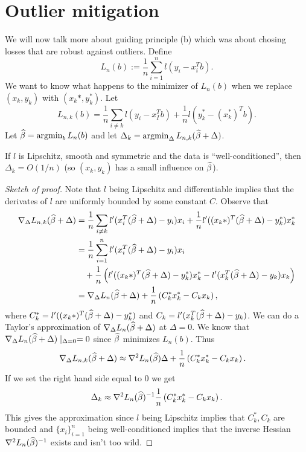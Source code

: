\section{Outlier mitigation}
We will now talk more about guiding principle (b) which was about chosing losses that are robust against outliers. Define
\[L_n(b):= \frac{1}{n}\sum_{i=1}^n l(y_i-x_i^Tb). \]
We want to know what happens to the minimizer of $L_n(b)$ when we replace $(x_k,y_k)$ with $(x_k*, y_k^*)$. Let
\[L_{n,k}(b)=\frac{1}{n}\sum_{i \neq k} l(y_i-x_I^Tb)+\frac{1}{n}l(y_k^*-(x_k^*)^Tb). \]
Let $\widehat{\beta}=\operatorname*{argmin}_b L_n(b)$ and let $\Delta_k = \operatorname*{argmin}_\Delta L_{n,k}(\widehat{\beta}+\Delta)$.
\begin{prop}
    If $l$ is Lipschitz, smooth and symmetric and the data is ``well-conditioned'', then $\Delta_k = O(1/n)$ (so $(x_k, y_k)$ has a small influence on $\widehat{\beta}$).
\end{prop}
\begin{proof}[Sketch of proof]
    Note that $l$ being Lipschitz and differentiable implies that the derivates of $l$ are uniformly bounded by some constant $C$. Observe that
    \begin{align*}
        \nabla_{\Delta} L_{n,k}(\widehat{\beta}+\Delta)&=\frac{1}{n}\sum_{i\neq k}l'(x_i^T(\widehat{\beta}+\Delta)-y_i)x_i+\frac{1}{n}l'((x_k*)^T(\widehat{\beta}+\Delta)-y_k^*)x_k^*\\
        &=\frac{1}{n}\sum_{i=1}^nl'(x_i^T(\widehat{\beta}+\Delta)-y_i)x_i\\
        &~~~+\frac{1}{n}\left(l'((x_k*)^T(\widehat{\beta}+\Delta)-y_k^*)x_k^*-l'(x_k^T(\widehat{\beta}+\Delta)-y_k)x_k\right)\\
        &=\nabla_{\Delta} L_n(\widehat{\beta}+\Delta)+\frac{1}{n}\left(C_k^*x_k^*-C_kx_k\right),
    \end{align*}
    where $C_k^*=l'((x_k*)^T(\widehat{\beta}+\Delta)-y_k^*)$ and $C_k = l'(x_k^T(\widehat{\beta}+\Delta)-y_k)$. We can do a Taylor's approximation of $\nabla_{\Delta} L_n(\widehat{\beta}+\Delta)$ at $\Delta=0$. We know that $\nabla_{\Delta} L_n(\widehat{\beta}+\Delta)\mid_{\Delta=0}=0$ since $\widehat{\beta}$ minimizes $L_n(b)$. Thus
    \begin{align*}
        \nabla_{\Delta} L_{n,k}(\widehat{\beta}+\Delta)&\approx \nabla^2 L_n(\widehat{\beta})\Delta + \frac{1}{n}\left(C_k^*x_k^*-C_kx_k\right).
    \end{align*}
    If we set the right hand side equal to 0 we get
    \[ \Delta_k\approx \nabla^2 L_n(\widehat{\beta})^{-1}\frac{1}{n}\left(C_k^*x_k^*-C_kx_k\right).\] 
    This gives the approximation since $l$ being Lipschitz implies that $C_k^*,C_k$ are bounded and $\{x_i\}_{i=1}^n$ being well-conditioned implies that the inverse Hessian $\nabla^2 L_n(\widehat{\beta})^{-1}$ exists and isn't too wild.
\end{proof}
